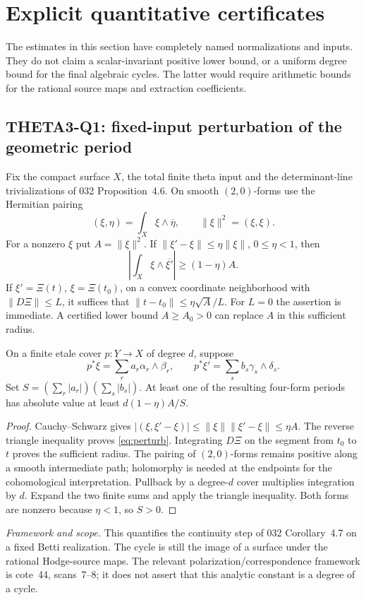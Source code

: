 \documentclass[11pt]{article}
\newcommand{\framework}[1]{\par\smallskip\noindent\textit{Framework and scope.} #1\par}
\theoremstyle{definition}\newtheorem{definition}[theorem]{Definition}\newtheorem{remark}[theorem]{Remark}
\begin{document}
\section{Explicit quantitative certificates}
\label{sec:quantitative}
The estimates in this section have completely named normalizations and inputs. They do not claim a scalar-invariant positive lower bound, or a uniform degree bound for the final algebraic cycles. The latter would require arithmetic bounds for the rational source maps and extraction coefficients.

\subsection{THETA3-Q1: fixed-input perturbation of the geometric period}\label{Q1}
Fix the compact surface $X$, the total finite theta input and the determinant-line trivializations of 032 Proposition~4.6. On smooth $(2,0)$-forms use the Hermitian pairing
\[
 (\xi,\eta)=\int_X\xi\wedge\overline\eta,
 \qquad \|\xi\|^2=(\xi,\xi).
\]
For a nonzero $\xi$ put $A=\|\xi\|^2$. If
$\|\xi'-\xi\|\leq\eta\|\xi\|$, $0\leq\eta<1$, then
\begin{equation}\label{eq:perturb}
 \left|\int_X\xi\wedge\overline{\xi'}\right|
 \geq (1-\eta)A.
\end{equation}
If $\xi'=\Xi(t)$, $\xi=\Xi(t_0)$, on a convex coordinate neighborhood with $\|D\Xi\|\leq L$, it suffices that
$\|t-t_0\|\leq\eta\sqrt A/L$. For $L=0$ the assertion is immediate. A certified lower bound $A\geq A_0>0$ can replace $A$ in this sufficient radius.

On a finite etale cover $p:Y\to X$ of degree $d$, suppose
\[
 p^*\xi=\sum_r a_r\alpha_r\wedge\beta_r,
 \qquad p^*\xi'=\sum_s b_s\gamma_s\wedge\delta_s.
\]
Set $S=(\sum_r|a_r|)(\sum_s|b_s|)$. At least one of the resulting four-form periods has absolute value at least
$d(1-\eta)A/S$.
\begin{proof}
Cauchy--Schwarz gives
$|(\xi,\xi'-\xi)|\leq\|\xi\|\|\xi'-\xi\|\leq\eta A$.
The reverse triangle inequality proves \eqref{eq:perturb}. Integrating $D\Xi$ on the segment from $t_0$ to $t$ proves the sufficient radius. The pairing of $(2,0)$-forms remains positive along a smooth intermediate path; holomorphy is needed at the endpoints for the cohomological interpretation. Pullback by a degree-$d$ cover multiplies integration by $d$. Expand the two finite sums and apply the triangle inequality. Both forms are nonzero because $\eta<1$, so $S>0$.
\end{proof}
\framework{This quantifies the continuity step of 032 Corollary~4.7 on a fixed Betti realization. The cycle is still the image of a surface under the rational Hodge-source maps. The relevant polarization/correspondence framework is cote~44, scans~7--8; it does not assert that this analytic constant is a degree of a cycle.}
\end{document}
